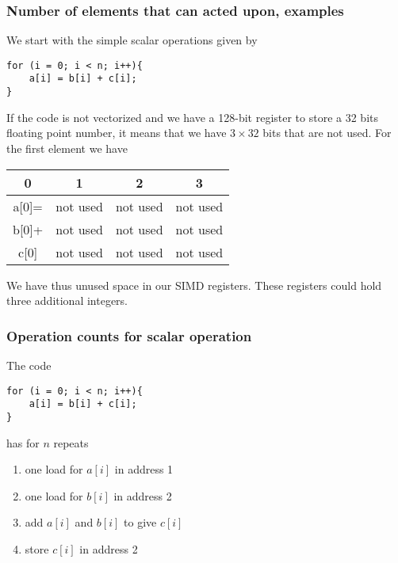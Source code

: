 \documentclass{beamer}
\begin{document}
\begin{frame}
\frametitle{Number of elements that can acted upon, examples}

We start with the simple scalar operations given by
\begin{verbatim}
for (i = 0; i < n; i++){
    a[i] = b[i] + c[i];
}
\end{verbatim}
If the code is not vectorized  and we have a 128-bit register to store a 32 bits floating point number,
it means that we have $3\times 32$ bits that are not used. For the first element we have



{\footnotesize
\begin{tabular}{cccc}
\hline
\multicolumn{1}{c}{ 0 } & \multicolumn{1}{c}{ 1 } & \multicolumn{1}{c}{ 2 } & \multicolumn{1}{c}{ 3 } \\
\hline
a[0]= & not used & not used & not used \\
\hline
b[0]+ & not used & not used & not used \\
\hline
c[0]  & not used & not used & not used \\
\hline
\end{tabular}
}

\noindent
We have thus unused space in our SIMD registers. These registers could hold three additional integers.
\end{frame}

\begin{frame}
\frametitle{Operation counts for scalar operation}

The code
\begin{verbatim}
for (i = 0; i < n; i++){
    a[i] = b[i] + c[i];
}
\end{verbatim}
has for $n$ repeats
\begin{enumerate}
\item one load for $a[i]$ in address 1

\item one load for $b[i]$ in address 2

\item add $a[i]$ and $b[i]$ to give $c[i]$

\item store $c[i]$ in address 2
\end{enumerate}

\noindent
\end{frame}
\end{document}

